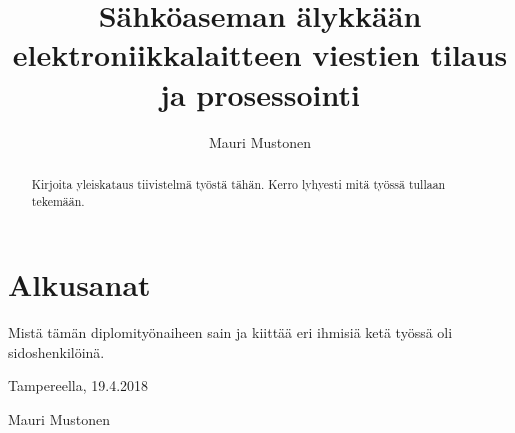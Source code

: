 \documentclass[globalnumbering,centeredcaptions,draftfooter]{tutthesis} %
\author{Mauri Mustonen}
\title{Sähköaseman älykkään elektroniikkalaitteen viestien tilaus ja prosessointi}
\begin{document}
\maketitle


\begin{abstract}
Kirjoita yleiskataus tiivistelmä työstä tähän. Kerro lyhyesti mitä työssä tullaan tekemään.
\end{abstract}


\iffalse
\begin{otherlanguage}{english}

\title{Tampere University of Technology thesis template}
\programme{...}
\thesisdescription{...}
\major{Mathematics}
\examiner{Professor Vilma Välkky\and Professor Matti Meikäläinen}
\keywords{thesis, template, thesis structure, thesis layout}

\begin{abstract}
The abstract is a self-contained, concise description of the thesis: what was the problem, what was done, what was the result.
Do not include charts or tables in the abstract.

First include the abstract written in the main language of the thesis and then the translation.
A bachelor's thesis in Finnish must also have a name in English for archival.
\end{abstract}
\end{otherlanguage}
\fi


\chapter*{Alkusanat}

Mistä tämän diplomityönaiheen sain ja kiittää eri ihmisiä ketä työssä oli sidoshenkilöinä.

\vspace{2\baselineskip}

Tampereella, 19.4.2018

\vspace{2\baselineskip}

Mauri Mustonen


\tableofcontents


\end{document}
